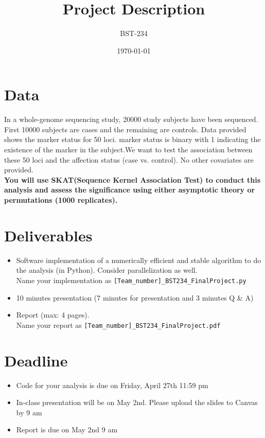\documentclass[a4paper]{article}
\title{Project Description}
\author{BST-234}
\date{\today}
\begin{document}
\maketitle

\section {Data}
In a whole-genome sequencing study, 20000 study subjects have been sequenced.  First 10000 subjects are cases and the remaining are controls. Data provided shows the marker status for 50 loci. marker status is binary with 1 indicating the existence of the marker in the subject.We want to test the association between these 50 loci and the affection status (case vs. control). No other covariates are provided. \\

\textbf{You will use SKAT(Sequence Kernel Association Test) to conduct this analysis and assess the significance using either asymptotic theory or permutations (1000 replicates).} 


\section {Deliverables}
\begin{itemize}
\item Software implementation of a numerically efficient and stable algorithm to do the analysis (in Python). Consider parallelization as well. \\
Name your implementation as \texttt{[Team_number]_BST234_FinalProject.py}
\item 10 minutes presentation (7 minutes for presentation and 3 minutes Q \& A)
\item Report (max: 4 pages). \\
Name your report as  \texttt{[Team_number]_BST234_FinalProject.pdf}
\end{itemize}


\section {Deadline}
\begin{itemize}
\item Code for your analysis is due on Friday, April 27th 11:59 pm
\item In-class presentation will be on May 2nd. Please upload the slides to Canvas by 9 am 
\item Report is due on May 2nd 9 am
\end{itemize}
\end{document}
